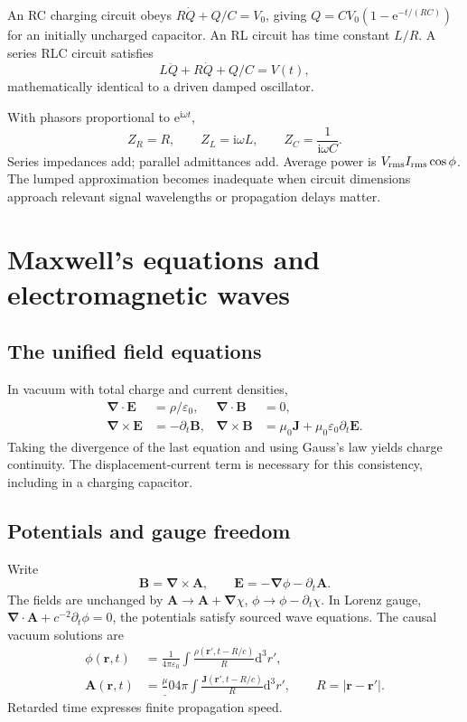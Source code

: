 \documentclass[11pt,oneside]{book}
\newcommand{\dd}{\mathrm{d}}
\newcommand{\ii}{\mathrm{i}}
\newcommand{\ee}{\mathrm{e}}
\newcommand{\vect}[1]{\boldsymbol{#1}}
\newcommand{\grad}{\boldsymbol{\nabla}}
\newcommand{\eps}{\varepsilon_0}
\newcommand{\mun}{\mu_0}
\theoremstyle{reviewstyle}
\begin{document}
An RC charging circuit obeys $R\dot Q+Q/C=V_0$, giving
$Q=CV_0(1-\ee^{-t/(RC)})$ for an initially uncharged capacitor. An RL circuit has time constant $L/R$. A series RLC circuit satisfies
\begin{equation}L\ddot Q+R\dot Q+Q/C=V(t),\end{equation}
mathematically identical to a driven damped oscillator.

With phasors proportional to $\ee^{\ii\omega t}$,
\begin{equation}Z_R=R,\qquad Z_L=\ii\omega L,\qquad Z_C=\frac1{\ii\omega C}.\end{equation}
Series impedances add; parallel admittances add. Average power is $V_{\rm rms}I_{\rm rms}\cos\phi$. The lumped approximation becomes inadequate when circuit dimensions approach relevant signal wavelengths or propagation delays matter.

\chapter{Maxwell's equations and electromagnetic waves}
\section{The unified field equations}
In vacuum with total charge and current densities,
\begin{align}
\grad\cdot\vect E&=\rho/\eps,&\grad\cdot\vect B&=0,\\
\grad\times\vect E&=-\partial_t\vect B,&
\grad\times\vect B&=\mun\vect J+\mun\eps\partial_t\vect E.
\end{align}
Taking the divergence of the last equation and using Gauss's law yields charge continuity. The displacement-current term is necessary for this consistency, including in a charging capacitor.
\section{Potentials and gauge freedom}
Write
\begin{equation}\vect B=\grad\times\vect A,\qquad \vect E=-\grad\phi-\partial_t\vect A.\end{equation}
The fields are unchanged by $\vect A\to\vect A+\grad\chi$, $\phi\to\phi-\partial_t\chi$. In Lorenz gauge, $\grad\cdot\vect A+c^{-2}\partial_t\phi=0$, the potentials satisfy sourced wave equations. The causal vacuum solutions are
\begin{align}
\phi(\vect r,t)&=\frac1{4\pi\eps}\int\frac{\rho(\vect r',t-R/c)}R\dd^3r',\\
\vect A(\vect r,t)&=\frac\mun{4\pi}\int\frac{\vect J(\vect r',t-R/c)}R\dd^3r',\qquad R=|\vect r-\vect r'|.
\end{align}
Retarded time expresses finite propagation speed.
\end{document}
